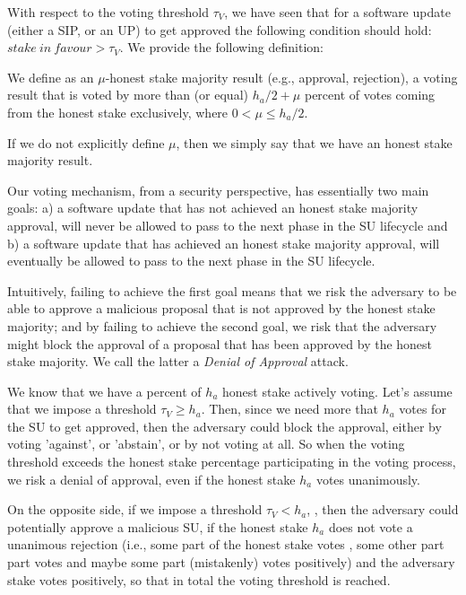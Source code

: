 With respect to the voting threshold $\tau_V$, we have seen that for a software update (either a SIP, or an UP) to get approved the following condition should hold: $stake\ in\ favour > \tau_V$. We provide the following definition:
\begin{definition}
We define as an $\mu$-honest stake majority result (e.g., approval, rejection), a voting result that is voted by more than (or equal) $h_a/2 + \mu$ percent of votes coming from the honest stake exclusively, where $0 < \mu \leq h_a/2$.

If we do not explicitly define $\mu$, then we simply say that we have an honest stake majority result. 
\end{definition}
Our voting mechanism, from a security perspective, has essentially two main goals: a) a software update that has not achieved an honest stake majority approval, will never be allowed to pass to the next phase in the SU lifecycle and b) a software update that has achieved an honest stake majority approval, will eventually be allowed to pass to the next phase in the SU lifecycle.

Intuitively, failing to achieve the first goal means that we risk the adversary to be able to approve a malicious proposal that is not approved by the honest stake majority; and by failing to achieve the second goal, we risk that the adversary might block the approval of a proposal that has been approved by the honest stake majority. We call the latter a \emph{Denial of Approval} attack.

We know that we have a percent of $h_a$ honest stake actively voting. Let's assume that we impose a threshold $\tau_V \geq h_a$.
 Then, since we need more that $h_a$ votes for the SU to get approved, then the adversary could block the approval, either by voting 'against', or 'abstain', or by not voting at all. So when the voting threshold exceeds the honest stake percentage participating in the voting process, we risk a denial of approval, even if the honest stake $h_a$ votes unanimously.
 
On the opposite side, if we impose a threshold $\tau_V < h_a$,  
, then the adversary could potentially approve a malicious SU, if the honest stake $h_a$ does not vote a unanimous rejection (i.e., some part of the honest stake votes , some other part part votes  and maybe some part (mistakenly) votes positively) and the adversary stake votes positively, so that in total the voting threshold is reached. 

